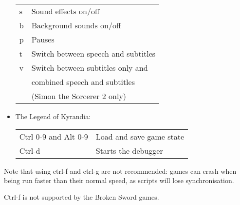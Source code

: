 \begin{itemize}
\begin{tabular}{ll}
    s                      & Sound effects on/off\\
    b                      & Background sounds on/off\\
    p                      & Pauses\\
    t                      & Switch between speech and subtitles\\
    v                      & Switch between subtitles only and\\
                           & combined speech and subtitles\\
                           & (Simon the Sorcerer 2 only)\\
  \end{tabular}
\item The Legend of Kyrandia:\\
  \begin{tabular}{ll}
    Ctrl 0-9 and Alt 0-9   & Load and save game state\\
    Ctrl-d                 & Starts the debugger\\
  \end{tabular}
\end{itemize}

Note that using ctrl-f and ctrl-g are not recommended: games can crash when
being run faster than their normal speed, as scripts will lose synchronisation.

Ctrl-f is not supported by the Broken Sword games.


